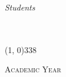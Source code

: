\begin{titlepage}
\begin{center}
\begin{large}
            \begin{flushright}
                \textit{Students}\\
                \vspace{5pt}
                \alberto \albertoid \\
                \savas \savasid \\
            \end{flushright}
        \end{large}

        \vspace{40pt}

        \line(1, 0){338} \\
        \begin{normalsize}
            \textsc{Academic Year \myAA}
        \end{normalsize}
    \end{center}
\end{titlepage}
